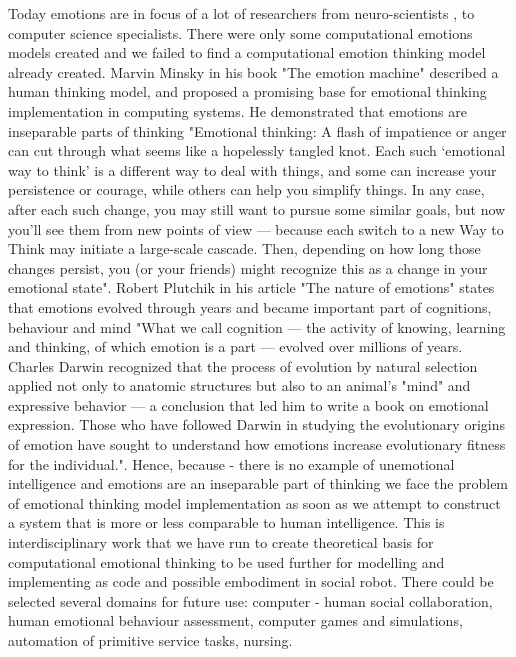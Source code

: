 Today emotions are in focus of a lot of researchers from neuro-scientists \cite{emotionsbraintorobot, parsingreward, neuromodulatory, cubeofemotions}, to computer science specialists\cite{emotionandsociable, senticcomputing, hourglass, affectivemodelofinterplay, affectivecomputing, affectivecomputingchallanges}.
There were only some computational emotions models created\cite{computationalmodelsemotion, computationalmodelsemotionscognition, evaluatingcomutationalmodel, threelevel} and we failed to find a computational emotion thinking model already created. Marvin Minsky in his book "The emotion machine"\cite{emotionmachine} described a human thinking model, and proposed a promising base for emotional thinking implementation in computing systems. He demonstrated that emotions are inseparable parts of thinking "Emotional thinking: A flash of impatience or anger can cut through what seems like a hopelessly tangled knot. Each such ‘emotional way to think' is a different way to deal with things, and some can increase your persistence or courage, while others can help you simplify things.
In any case, after each such change, you may still want to pursue some similar goals, but now you’ll see them from new points of view — because each switch to a new Way to Think may initiate a large-scale cascade. Then, depending on how long those changes persist, you (or your friends) might recognize this as a change in your emotional state". Robert Plutchik in his article "The nature of emotions" \cite{natureofemotions} states that emotions evolved through years and became important part of cognitions, behaviour and mind "What we call cognition — the activity of knowing, learning and thinking, of which emotion is a part — evolved over millions of years. Charles Darwin recognized that the process of evolution by natural selection applied not only to anatomic structures but also to an animal's "mind" and expressive behavior — a conclusion that led him to write a book on emotional expression. Those who have followed Darwin in studying the evolutionary origins of emotion have sought to understand how emotions increase evolutionary fitness for the individual.". Hence, because - there is no example of unemotional intelligence and emotions are an inseparable part of thinking we face the problem of emotional thinking model implementation as soon as we attempt to construct a system that is more or less comparable to human intelligence. This is interdisciplinary work that we have run to create theoretical basis for computational emotional thinking to be used further for modelling and implementing as code and possible embodiment in social robot. There could be selected several domains for future use: computer - human social collaboration, human emotional behaviour assessment, computer games and simulations, automation of primitive service tasks, nursing.

